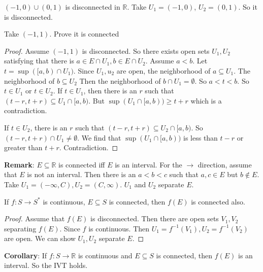 \documentclass{report}
\begin{document}
\begin{examples}
    \begin{example}
        $(-1, 0) \cup(0, 1)$ is disconnected in $\mathbb{R}$. Take $U_{1} = (-1, 0)$, $U_{2} = (0, 1)$. So it is disconnected.
    \end{example}
    \begin{example}
        Take $(-1, 1)$. Prove it is connected
            \begin{proof}
                Assume $(-1, 1)$ is disconnected. So there exists open sets $U_{1}, U_{2}$ satisfying that there is $a \in E \cap U_{1}, b \in E \cap U_{2}$. Assume $a < b$. Let $t = \sup([a, b) \cap U_{1})$. Since $U_{1}, u_{2}$ are open, the neighborhood of $a \subseteq U_{1}$. The neighborhood of $b \subseteq U_{2}$ Then the neighborhood of $b \cap U_{1} = \emptyset$. So $a < t < b$. So $t \in U_{1}$ or $t \in U_{2}$. If $t \in U_{1}$, then there is an $r$ such that $(t - r, t + r) \subseteq U_{1} \cap[a, b)$. But $\sup(U_{1} \cap[a, b)) \geq t + r$ which is a contradiction. 

                If $t \in U_{2}$, there is an $r$ such that $(t - r, t +r) \subseteq U_{2} \cap[a, b)$. So $(t - r, t + r) \cap U_{1} \neq \emptyset$. We find that $\sup(U_{1} \cap[a, b))$ is less than $t - r$ or greater than $t + r$. Contradiction.
            \end{proof}
    \end{example}
\end{examples}

\textbf{Remark}: $E \subseteq \mathbb{R}$ is connected iff $E$ is an interval. For the $\rightarrow $ direction, assume that $E$ is not an interval. Then there is an $a <  b < c$ such that $a, c \in E$ but $b \notin E$. Take $U_{1} = (-\infty , C), U_{2} = (C, \infty )$. $U_{1}$ and $U_{2}$ separate $E$.

\begin{theorem}{22.2}
    If $f : S \rightarrow S^{*}$ is continuous, $E \subseteq  S$ is connected, then $f(E)$ is connected also.
\end{theorem}
    \begin{proof}
        Assume that $f (E)$ is disconnected. Then there are open sets $V_{1}, V_{2}$ separating $f(E)$. Since $f$ is continuous. Then $U_{1} = f^{-1}(V_{1}), U_{2} = f^{-1}(V_{2})$ are open. We can show $U_{1}, U_{2}$ separate $E$.
    \end{proof}
\textbf{Corollary}: If $f : S \rightarrow \mathbb{R}$ is continuous and $E \subseteq S$ is connected, then $f(E)$ is an interval. So the IVT holds.
\end{document}
